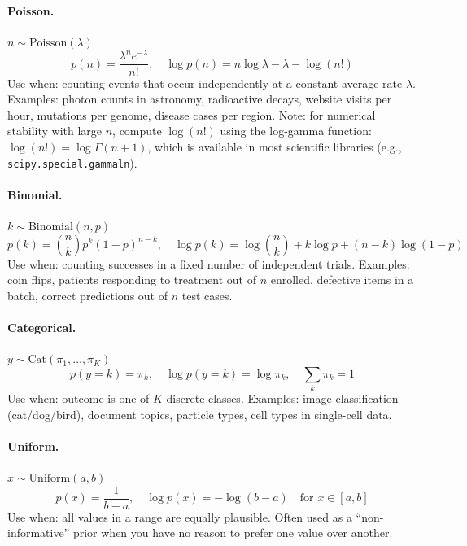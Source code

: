 \documentclass[11pt]{article}
\begin{document}
\paragraph{Poisson.} $n \sim \text{Poisson}(\lambda)$
\begin{equation}
p(n) = \frac{\lambda^n e^{-\lambda}}{n!}, \quad \log p(n) = n \log \lambda - \lambda - \log(n!)
\end{equation}
Use when: counting events that occur independently at a constant average rate $\lambda$. Examples: photon counts in astronomy, radioactive decays, website visits per hour, mutations per genome, disease cases per region. Note: for numerical stability with large $n$, compute $\log(n!)$ using the log-gamma function: $\log(n!) = \log\Gamma(n+1)$, which is available in most scientific libraries (e.g., \texttt{scipy.special.gammaln}).

\paragraph{Binomial.} $k \sim \text{Binomial}(n, p)$
\begin{equation}
p(k) = \binom{n}{k} p^k (1-p)^{n-k}, \quad \log p(k) = \log\binom{n}{k} + k \log p + (n-k) \log(1-p)
\end{equation}
Use when: counting successes in a fixed number of independent trials. Examples: coin flips, patients responding to treatment out of $n$ enrolled, defective items in a batch, correct predictions out of $n$ test cases.

\paragraph{Categorical.} $y \sim \text{Cat}(\pi_1, \ldots, \pi_K)$
\begin{equation}
p(y = k) = \pi_k, \quad \log p(y = k) = \log \pi_k, \quad \sum_k \pi_k = 1
\end{equation}
Use when: outcome is one of $K$ discrete classes. Examples: image classification (cat/dog/bird), document topics, particle types, cell types in single-cell data.

\paragraph{Uniform.} $x \sim \text{Uniform}(a, b)$
\begin{equation}
p(x) = \frac{1}{b-a}, \quad \log p(x) = -\log(b-a) \quad \text{for } x \in [a, b]
\end{equation}
Use when: all values in a range are equally plausible. Often used as a ``non-informative'' prior when you have no reason to prefer one value over another.
\end{document}
